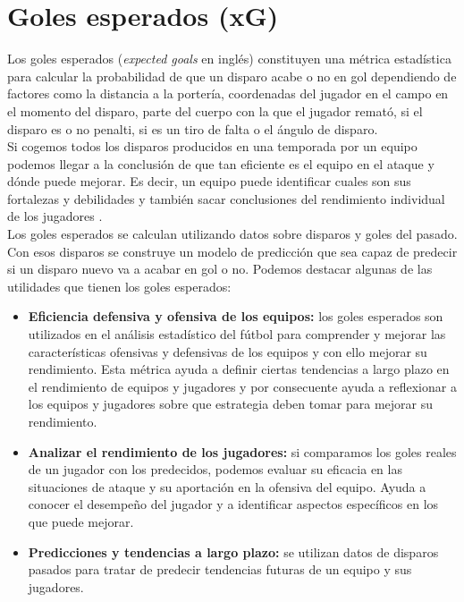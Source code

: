 \section{Goles esperados (xG)}
Los goles esperados (\textit{expected goals} en inglés) constituyen una métrica estadística para calcular la probabilidad de que un disparo acabe o no en gol dependiendo de factores como la distancia a la portería, coordenadas del jugador en el campo en el momento del disparo, parte del cuerpo con la que el jugador remató, si el disparo es o no penalti, si es un tiro de falta o el ángulo de disparo. \\
Si cogemos todos los disparos producidos en una temporada por un equipo podemos llegar a la conclusión de que tan eficiente es el equipo en el ataque y dónde puede mejorar. Es decir, un equipo puede identificar cuales son sus fortalezas y debilidades y también sacar conclusiones del rendimiento individual de los jugadores \cite{golesEsperados:latex}. \\
Los goles esperados se calculan utilizando datos sobre disparos y goles del pasado. Con esos disparos se construye un modelo de predicción que sea capaz de predecir si un disparo nuevo va a acabar en gol o no.
Podemos destacar algunas de las utilidades que tienen los goles esperados:
\begin{itemize}
    \item \textbf{Eficiencia defensiva y ofensiva de los equipos:} los goles esperados son utilizados en el análisis estadístico del fútbol para comprender y mejorar las características ofensivas y defensivas de los equipos y con ello mejorar su rendimiento. Esta métrica ayuda a definir ciertas tendencias a largo plazo en el rendimiento de equipos y jugadores y por consecuente ayuda a reflexionar a los equipos y jugadores sobre que estrategia deben tomar para mejorar su rendimiento.
    \item \textbf{Analizar el rendimiento de los jugadores:} si comparamos los goles reales de un jugador con los predecidos, podemos evaluar su eficacia en las situaciones de ataque y su aportación en la ofensiva del equipo. Ayuda a conocer el desempeño del jugador y a identificar aspectos específicos en los que puede mejorar.
    \item \textbf{Predicciones y tendencias a largo plazo:} se utilizan datos de disparos pasados para tratar de predecir tendencias futuras de un equipo y sus jugadores. 
\end{itemize}

